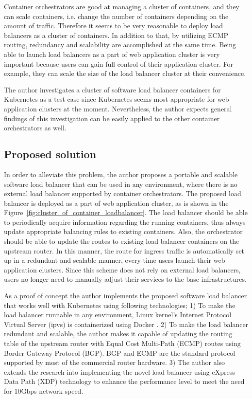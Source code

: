 Container orchestrators are good at managing a cluster of containers, and they can scale containers, i.e. change the number of containers depending on the amount of traffic.
Therefore it seems to be very reasonable to deploy load balancers as a cluster of containers.
In addition to that, by utilizing ECMP routing, redundancy and scalability are accomplished at the same time.
Being able to launch load balancers as a part of web application cluster is very important because users can gain full control of their application cluster.
For example, they can scale the size of the load balancer cluster at their convenience.

The author investigates a cluster of software load balancer containers for Kubernetes as a test case since Kubernetes seems most appropriate for web application clusters at the moment.
Nevertheless, the author expects general findings of this investigation can be easily applied to the other container orchestrators as well.

\subsection{Proposed solution}

In order to alleviate this problem, the author proposes a portable and scalable software load balancer that can be used in any environment, where there is no external load balancer supported by container orchestrators.
The proposed load balancer is deployed as a part of web application cluster, as is shown in the Figure~\ref{fig:cluster_of_container_loadbalancer}.
The load balancer should be able to periodically acquire information regarding the running containers, thus always update appropriate balancing rules to existing containers.
Also, the orchestrator should be able to update the routes to existing load balancer containers on the upstream router.
In this manner, the route for ingress traffic is automatically set up in a redundant and scalable manner, every time users launch their web application clusters.
Since this scheme does not rely on external load balancers, users no longer need to manually adjust their services to the base infrastructures.

As a proof of concept the author implements the proposed software load balancer that works well with Kubernetes using following technologies;
1) To make the load balancer runnable in any environment, Linux kernel's Internet Protocol Virtual Server (ipvs) \cite{Zhang2000} is containerized using Docker \cite{merkel2014docker}. 
2) To make the load balancer redundant and scalable, the author makes it capable of updating the routing table of the upstream router with Equal Cost Multi-Path (ECMP) routes \cite{al2008scalable} using Border Gateway Protocol (BGP).
BGP and ECMP are the standard protocol supported by most of the commercial router hardware.
3) The author also extends the research into implementing the novel load balancer using eXpress Data Path (XDP) technology \cite{bertin2017xdp} to enhance the performance level to meet the need for 10Gbps network speed.

